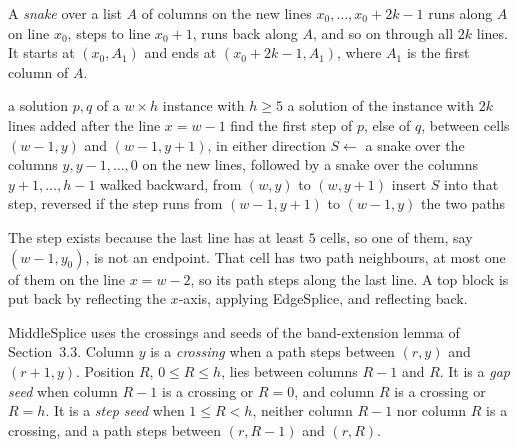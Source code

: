 \documentclass[11pt]{article}
\begin{document}
A \emph{snake} over a list $A$ of columns on the new lines $x_0,\ldots,x_0+2k-1$ runs along $A$ on
line $x_0$, steps to line $x_0+1$, runs back along $A$, and so on through all $2k$ lines. It
starts at $(x_0,A_1)$ and ends at $(x_0+2k-1,A_1)$, where $A_1$ is the first column of $A$.

\begin{algorithm}[H]
\caption{EdgeSplice$(p,q,k)$, a bottom block of $2k$ lines}\label{alg:edge}
\begin{algorithmic}[1]
\Require a solution $p,q$ of a $w\times h$ instance with $h\ge 5$
\Ensure a solution of the instance with $2k$ lines added after the line $x=w-1$
\State find the first step of $p$, else of $q$, between cells $(w-1,y)$ and $(w-1,y+1)$, in
  either direction
\State $S \gets$ a snake over the columns $y, y-1, \ldots, 0$ on the new lines, followed by a snake
  over the columns $y+1,\ldots,h-1$ walked backward, from $(w,y)$ to $(w,y+1)$
\State insert $S$ into that step, reversed if the step runs from $(w-1,y+1)$ to $(w-1,y)$
\State \Return the two paths
\end{algorithmic}
\end{algorithm}

The step exists because the last line has at least $5$ cells, so one of them, say $(w-1,y_0)$, is
not an endpoint. That cell has two path neighbours, at most one of them on the line $x=w-2$, so its
path steps along the last line. A top block is put back by reflecting the $x$-axis, applying
EdgeSplice, and reflecting back.

MiddleSplice uses the crossings and seeds of the band-extension lemma of Section~3.3. Column $y$ is
a \emph{crossing} when a path steps between $(r,y)$ and $(r+1,y)$. Position $R$, $0\le R\le h$, lies
between columns $R-1$ and $R$. It is a \emph{gap seed} when column $R-1$ is a crossing or $R=0$,
and column $R$ is a crossing or $R=h$. It is a \emph{step seed} when $1\le R<h$, neither column
$R-1$ nor column $R$ is a crossing, and a path steps between $(r,R-1)$ and $(r,R)$.
\end{document}
